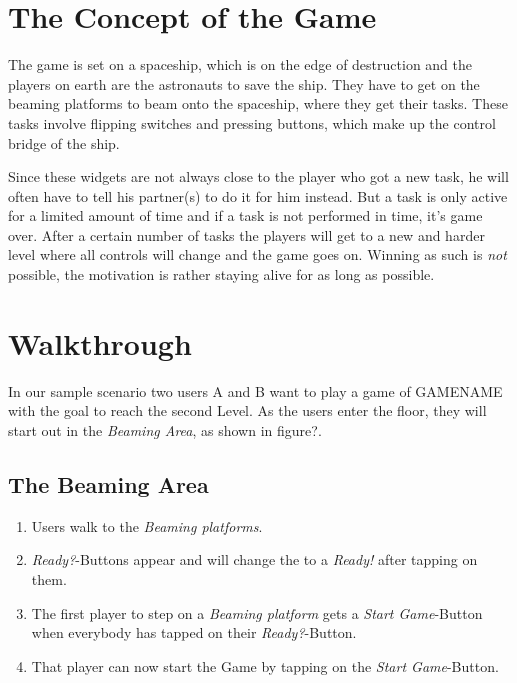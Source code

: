 \documentclass{sigchi}
\begin{document}
\section{The Concept of the Game}
\vspace{1mm}
The game is set on a spaceship, which is on the edge of destruction and the players on earth are the astronauts to save the ship. They have to get on the beaming platforms to beam onto the spaceship, where they get their tasks. These tasks involve flipping switches and pressing buttons, which make up the control bridge of the ship. 

Since these widgets are not always close to the player who got a new task, he will often have to tell his partner(s) to do it for him instead. But a task is only active for a limited amount of time and if a task is not performed in time, it's game over. \newline
After a certain number of tasks the players will get to a new and harder level where all controls will change and the game goes on. Winning as such is \textit{not} possible, the motivation is rather staying alive for as long as possible.

\section{Walkthrough}
\vspace{1mm}
In our sample scenario two users A and B want to play a game of GAMENAME with the goal to reach the second Level. As the users enter the floor, they will start out in the \textit{Beaming Area}, as shown in figure?.

\subsection{The Beaming Area}
\vspace{2mm}
\begin{enumerate}
\item Users walk to the \textit{Beaming platforms}. 
\item \textit{Ready?}-Buttons appear and will change the to a \textit{Ready!} after tapping on them.
\item The first player to step on a \textit{Beaming platform} gets a \textit{Start Game}-Button when everybody has tapped on their \textit{Ready?}-Button.
\item That player can now start the Game by tapping on the \textit{Start Game}-Button.
\end{enumerate}
\end{document}
